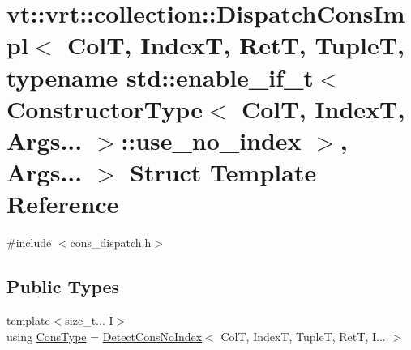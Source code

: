 \hypertarget{structvt_1_1vrt_1_1collection_1_1_dispatch_cons_impl_3_01_col_t_00_01_index_t_00_01_ret_t_00_01_7bb06b6d2cbf7ddb7e46d39f1adc61e1}{}\section{vt\+:\+:vrt\+:\+:collection\+:\+:Dispatch\+Cons\+Impl$<$ ColT, IndexT, RetT, TupleT, typename std\+:\+:enable\+\_\+if\+\_\+t$<$ Constructor\+Type$<$ ColT, IndexT, Args... $>$\+:\+:use\+\_\+no\+\_\+index $>$, Args... $>$ Struct Template Reference}
\label{structvt_1_1vrt_1_1collection_1_1_dispatch_cons_impl_3_01_col_t_00_01_index_t_00_01_ret_t_00_01_7bb06b6d2cbf7ddb7e46d39f1adc61e1}


{\ttfamily \#include $<$cons\+\_\+dispatch.\+h$>$}

\subsection*{Public Types}
\begin{DoxyCompactItemize}
\item 
{\footnotesize template$<$size\+\_\+t... I$>$ }\\using \hyperlink{structvt_1_1vrt_1_1collection_1_1_dispatch_cons_impl_3_01_col_t_00_01_index_t_00_01_ret_t_00_01_7bb06b6d2cbf7ddb7e46d39f1adc61e1_a61a00682e44b5dd476dd37289a1a45c1}{Cons\+Type} = \hyperlink{structvt_1_1vrt_1_1collection_1_1_detect_cons_no_index}{Detect\+Cons\+No\+Index}$<$ ColT, IndexT, TupleT, RetT, I... $>$
\end{DoxyCompactItemize}


